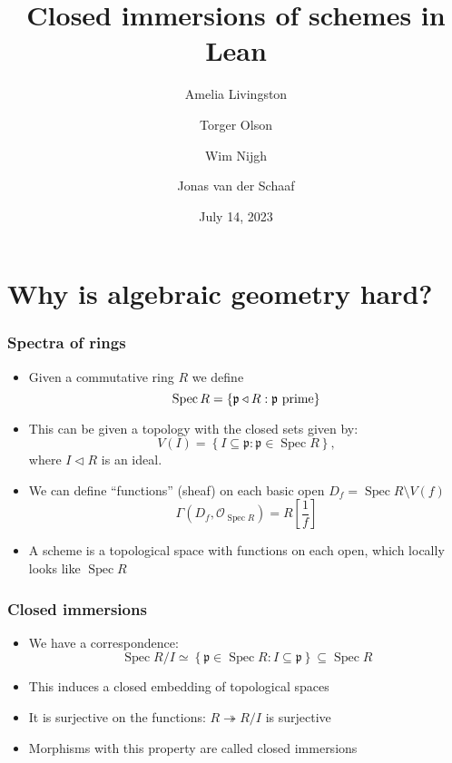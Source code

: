 \documentclass{beamer}
\title{Closed immersions of schemes in Lean}
\author{Amelia Livingston \and Torger Olson \and Wim Nijgh \and Jonas van der Schaaf}
\date{July 14, 2023}
\newcommand{\sheaf}{\mathcal{O}}
\newcommand{\primeid}{\mathfrak{p}}
\newcommand{\setwith}[2]{\left\{#1:#2\right\}}
\DeclareMathOperator{\spec}{Spec}
\newcommand{\ideal}{\triangleleft}
\begin{document}
\maketitle

\section{Why is algebraic geometry hard?}

\begin{frame}
    \frametitle{Spectra of rings}

    \begin{itemize}
        \item Given a commutative ring \(R\) we define
              \[
                  \spec R=\setwith{\primeid\ideal R}{\textnormal{\(\primeid\) prime}}
              \]
        \item This can be given a topology with the closed sets given by:
              \[
                  V(I)=\setwith{I\subseteq \primeid}{\primeid \in \spec R},
              \]
              where $I\ideal R$ is an ideal.
        \item We can define ``functions'' (sheaf) on each basic open \(D_{f}=\spec
              R\setminus V(f)\)
              \[
                  \Gamma(D_{f},\sheaf_{\spec R})=R\left[\frac{1}{f}\right]
              \]
        \item A scheme is a topological space with functions on each open, which
              locally looks like $\spec R$
    \end{itemize}

\end{frame}

\begin{frame}
    \frametitle{Closed immersions}

    \begin{itemize}
        \item We have a correspondence:
              \[
                  \spec R/I\simeq\setwith{\primeid\in\spec R}{I\subseteq\primeid}\subseteq\spec R
              \]

        \item This induces a closed embedding of topological spaces

        \item It is surjective on the functions: \(R\twoheadrightarrow R/I\) is
              surjective

        \item Morphisms with this property are called closed immersions
    \end{itemize}

\end{frame}
\end{document}
